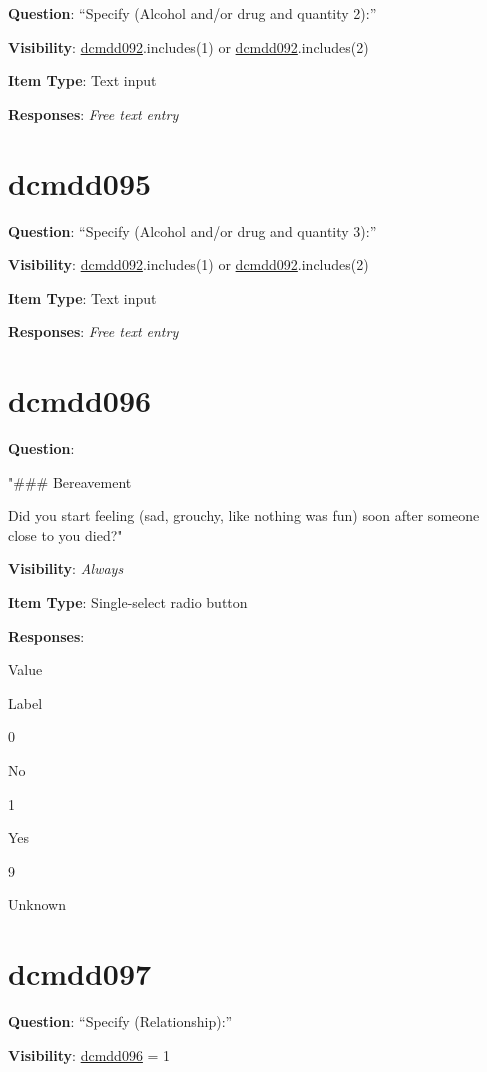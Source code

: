 \documentclass[
]{book}
\begin{document}
\textbf{Question}: ``Specify (Alcohol and/or drug and quantity 2):''

\textbf{Visibility}: \protect\hyperlink{dcmdd092}{dcmdd092}.includes(1) or \protect\hyperlink{dcmdd092}{dcmdd092}.includes(2)

\textbf{Item Type}: Text input

\textbf{Responses}: \emph{Free text entry}

\hypertarget{dcmdd095}{%
\section{dcmdd095}\label{dcmdd095}}

\textbf{Question}: ``Specify (Alcohol and/or drug and quantity 3):''

\textbf{Visibility}: \protect\hyperlink{dcmdd092}{dcmdd092}.includes(1) or \protect\hyperlink{dcmdd092}{dcmdd092}.includes(2)

\textbf{Item Type}: Text input

\textbf{Responses}: \emph{Free text entry}

\hypertarget{dcmdd096}{%
\section{dcmdd096}\label{dcmdd096}}

\textbf{Question}:

"\#\#\# Bereavement

Did you start feeling (sad, grouchy, like nothing was fun) soon after someone close to you died?"

\textbf{Visibility}: \emph{Always}

\textbf{Item Type}: Single-select radio button

\textbf{Responses}:

Value

Label

0

No

1

Yes

9

Unknown

\hypertarget{dcmdd097}{%
\section{dcmdd097}\label{dcmdd097}}

\textbf{Question}: ``Specify (Relationship):''

\textbf{Visibility}: \protect\hyperlink{dcmdd096}{dcmdd096} = 1
\end{document}

